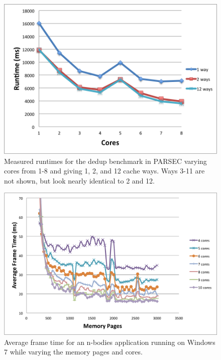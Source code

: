 \begin{figure}[hb]
\center
\includegraphics*[width=.80\columnwidth]{Figures/dedup_5hp.png}
\caption{\label{dedup_outlier_fig} Measured runtimes for the dedup benchmark in PARSEC varying cores from 1-8 and giving 1, 2, and 12 cache ways. Ways 3-11 are not shown, but look nearly identical to 2 and 12.}
\end{figure}

\begin{figure}[hb]
\center
\includegraphics*[width=.80\columnwidth]{Figures/mem_page_data.png}
\caption{\label{mem_page_fig} Average frame time for an n-bodies application running on Windows 7 while varying the memory pages and cores.}
\end{figure}


